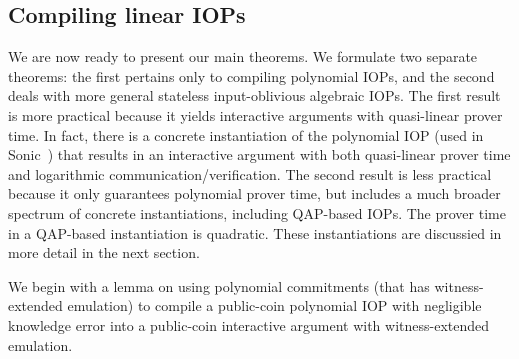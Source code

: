 \subsection{Compiling linear IOPs} 
We are now ready to present our main theorems. We formulate two separate theorems: the first pertains only to compiling polynomial IOPs, and the second deals with more general stateless input-oblivious algebraic IOPs. The first result is more practical because it yields interactive arguments with quasi-linear prover time. In fact, there is a concrete instantiation of the polynomial IOP (used in Sonic~\cite{Sonic}) that results in an interactive argument with both quasi-linear prover time and logarithmic communication/verification. The second result is less practical because it only guarantees polynomial prover time, but includes a much broader spectrum of concrete instantiations, including QAP-based IOPs. The prover time in a QAP-based instantiation is quadratic. These instantiations are discussied in more detail in the next section. 

We begin with a lemma on using polynomial commitments (that has witness-extended emulation) to compile a public-coin polynomial IOP with negligible knowledge error into a public-coin interactive argument with witness-extended emulation. 

\begin{lemma}

\end{lemma}





